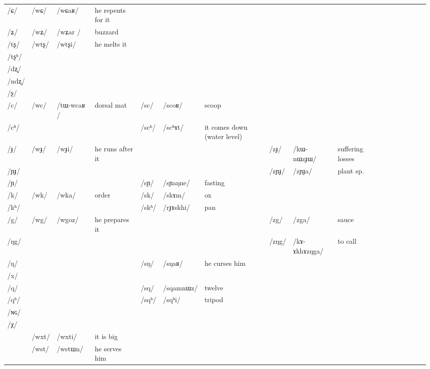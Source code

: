 \documentclass[oldfontcommands,oneside,a4paper,11pt]{article}
\newcommand{\ipa}[1]{{\phon/#1/}} %
\newcommand{\deux}[1]{/#1/}
\newcommand{\trois}[1]{/#1/}
\newcommand{\tib}[1]{\cellcolor{lightgray}\textbf{#1}}
\begin{document}
\begin{table}
{\begin{tabular}{l|lll|lll|lll|lllllll}
\ipa{ɕ}  &	\deux{wɕ}  &	\ipa{wɕaʁ}  &he repents for it&	  &	  &	&	  &	  &	&	\\	
\ipa{ʑ}  &	\deux{wʑ}  &	\ipa{wʑar }  &	buzzard&	  &	  &	&	  &	  &	&	\\
\ipa{tʂ}  &	\deux{wtʂ}  &	\ipa{wtʂi}  & he melts it	&	  &	  &	&	  &	  &	&	\\
\ipa{tʂʰ}  &	  &	  &	&	  &	  &	&	  &	  &	&	\\
\ipa{dʐ}  &	  &	  &	&	  &	  &	&	  &	  &	&	\\
\ipa{ndʐ}  &	  &	  &	&	  &	  &	&	  &	  &	&	\\
\ipa{ʂ}  &	  &	  &	&	  &	  &	&	  &	  &	&	\\
\ipa{c}  &	\deux{wc}  &	\ipa{tɯ-wcaʁ }  &dorsal mat	&	\deux{sc}  &	\ipa{scoʁ}  &scoop	&	  &	  &	&	\\
\ipa{cʰ}  &	  &	  &	&	\deux{scʰ}  &	\ipa{scʰɤt}  &	it comes down (water level)&	  &	  &	&	\\
\ipa{ɟ}  &	\deux{wɟ}  &	\ipa{wɟi}  &he runs after it	&	  &	  &	&	\deux{zɟ}  &	\ipa{kɯ-nɯzɟɯ}  &	  suffering losses&	\\
\ipa{ɲɟ}  &	  &	  &	&	  &	  &	&	\deux{zɲɟ}  &	\ipa{zɲɟa}  &	plant sp.&	\\
\ipa{ɲ}  &	  &	  &	&	\deux{sɲ}  &	\ipa{sɲaŋne}  &fasting	&	   &	 &	&	\\
\ipa{k}  &	\deux{wk}  &	\ipa{wka}  &	order&	\deux{sk}  &	\ipa{skɤm}  &	ox&	  &	  &	&	\\
\ipa{kʰ}  &	  &	  &	&	\deux{skʰ}  &	\ipa{rɟɤskhi}  &pan	&	  &	  &	&	\\
\ipa{g}  &	\deux{wg}  \tib{}&	\ipa{wgoz}  &	he prepares it&	  &	  &	& 	\deux{zg}  &	\ipa{zga}  &	sauce&	\\
\ipa{ŋg}  &	  &	  &	&	  &	  &	&	\deux{zŋg}  &	\ipa{kɤ-ɤkhɤzŋga}  &	to call&	\\
\ipa{ŋ}  &	  &	  &	&	\deux{sŋ}  &	\ipa{sŋaʁ}  &	he curses him&	  &	  &	&	\\
\ipa{x}  &	  &	  &	&	  &	  &	&	  &	  &	&	\\
\ipa{q}  &	  &	  &	&	\deux{sq}  &	\ipa{sqamnɯz}  &	twelve&	  &	  &	&	\\
\ipa{qʰ}  &	  &	  &	&	\deux{sqʰ}  &	\ipa{sqʰi}  &	tripod&	  &	  &	&	\\
\ipa{ɴɢ}  &	  &	  &	&	  &	  &	&	  &	  &	&	\\
\ipa{χ}  &	  &	  &	&	  &	  &	&	  &	  &	&	\\
\midrule
&	\trois{wxt}  &	\ipa{wxti}  &it is big	\\
&	\trois{wst} \tib{} &	\ipa{wstɯn}  &he serves him	\\

\end{tabular}}
\end{table}
\end{document}

